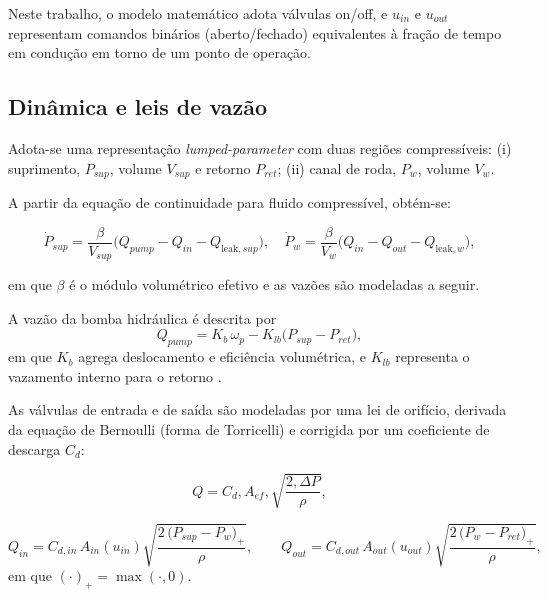 Neste trabalho, o modelo matemático adota válvulas on/off, e $u_{in}$ e $u_{out}$ representam comandos binários (aberto/fechado) equivalentes à fração de tempo em condução em torno de um ponto de operação.

\subsection{Dinâmica e leis de vazão}
\label{sec:controle-modelo-hidraulico-2p}

Adota-se uma representação \emph{lumped-parameter} com duas regiões compressíveis: (i) suprimento, $P_{sup}$, volume $V_{sup}$ e retorno $P_{ret}$; (ii) canal de roda, $P_w$, volume $V_w$.

A partir da equação de continuidade para fluido compressível, obtém-se:

\begin{equation}
    \dot{P}_{sup} = \frac{\beta}{V_{sup}}\Big(Q_{pump} - Q_{in} - Q_{\text{leak},sup}\Big),
    \quad
    \dot{P}_{w} = \frac{\beta}{V_{w}}\Big(Q_{in} - Q_{out} - Q_{\text{leak},w}\Big),
    \label{eq:din_press}
\end{equation}

em que $\beta$ é o módulo volumétrico efetivo e as vazões são modeladas a seguir.

A vazão da bomba hidráulica é descrita por
\begin{equation}
    Q_{pump} = K_b\,\omega_p - K_{lb}\big(P_{sup}-P_{ret}\big),
    \label{eq:qpump_2p}
\end{equation}
em que $K_b$ agrega deslocamento e eficiência volumétrica, e $K_{lb}$ representa o vazamento interno para o retorno \cite{MotorParametricDesign2023,WangBingbing2015}.

As válvulas de entrada e de saída são modeladas por uma lei de orifício, derivada da equação de Bernoulli (forma de Torricelli) e corrigida por um coeficiente de descarga $C_d$:

\begin{equation}
    Q = C_d,A_{ef},\sqrt{\frac{2,\Delta P}{\rho}},
    \label{eq:lei-orificio}
\end{equation}

\begin{equation}
    Q_{in} = C_{d,in}\,A_{in}(u_{in})\sqrt{\frac{2\,\big(P_{sup}-P_w\big)_{+}}{\rho}},
    \qquad
    Q_{out} = C_{d,out}\,A_{out}(u_{out})\sqrt{\frac{2\,\big(P_{w}-P_{ret}\big)_{+}}{\rho}},
    \label{eq:qin_qout}
\end{equation}
em que $(\cdot)_{+}=\max(\cdot,0)$.

